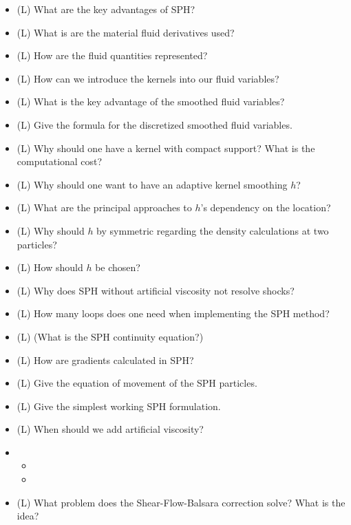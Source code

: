 \begin{itemize}
    \item (L) What are the key advantages of SPH?
    \item (L) What is are the material fluid derivatives used?
    \item (L) How are the fluid quantities represented?
    \item (L) How can we introduce the kernels into our fluid variables?
    \item (L) What is the key advantage of the smoothed fluid variables?
    \item (L) Give the formula for the discretized smoothed fluid variables.
    \item (L) Why should one have a kernel with compact support? What is the computational cost?
    \item (L) Why should one want to have an adaptive kernel smoothing $h$?
    \item (L) What are the principal approaches to $h$'s dependency on the location?
    \item (L) Why should $h$ by symmetric regarding the density calculations at two particles?
    \item (L) How should $h$ be chosen?
    \item (L) Why does SPH without artificial viscosity not resolve shocks?
    \item (L) How many loops does one need when implementing the SPH method?
    \item (L) (What is the SPH continuity equation?)
    \item (L) How are gradients calculated in SPH?
    \item (L) Give the equation of movement of the SPH particles.
    \item (L) Give the simplest working SPH formulation.
    \item (L) When should we add artificial viscosity?
    \item \begin{itemize}
        \item {}
        \item {}
    \end{itemize}
    \item (L) What problem does the Shear-Flow-Balsara correction solve? What is the idea?
    \begin{itemize}

\end{itemize}
\end{itemize}
